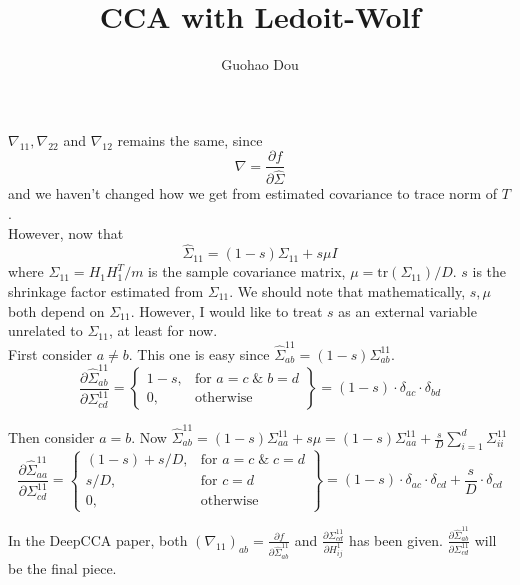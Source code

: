 \documentclass[12pt]{article}
\begin{document}
 
 
\title{CCA with Ledoit-Wolf}%
\author{Guohao Dou} %
 
\maketitle
$\nabla_{11}, \nabla_{22}$ and $\nabla_{12}$ remains the same, since 
\[\nabla = \frac{\partial f}{\partial \hat\Sigma}\]
and we haven't changed how we get from estimated covariance to trace norm of $T$.\\

However, now that 
\[\hat\Sigma_{11} = (1-s)\Sigma_{11} + s\mu I\]
where $\Sigma_{11} = H_1H_1^T / m$ is the sample covariance matrix, $\mu = \text{tr}(\Sigma_{11})/D$. $s$ is the shrinkage factor estimated from $\Sigma_{11}$. We should note that mathematically, $s, \mu$ both depend on $\Sigma_{11}$. However, I would like to treat $s$ as an external variable unrelated to $\Sigma_{11}$, at least for now. \\

First consider $a \neq b$. This one is easy since $\hat\Sigma_{ab}^{11} = (1-s)\Sigma^{11}_{ab}$. 
\[
\frac{\partial \hat\Sigma^{11}_{ab}}{\partial \Sigma^{11}_{cd}} = \left.
\begin{cases}
  1 - s, & \text{for } a = c \;\&\; b = d \\
  0, & \text{otherwise}
\end{cases}
\right\} = (1 - s)\cdot \delta_{ac}\cdot \delta_{bd}
\]

Then consider $a = b$. Now $\hat\Sigma_{ab}^{11} = (1-s)\Sigma^{11}_{aa} + s\mu = (1-s)\Sigma^{11}_{aa} + \frac{s}{D}\sum_{i=1}^d \Sigma_{ii}^{11}$
\[
\frac{\partial \hat\Sigma^{11}_{aa}}{\partial \Sigma^{11}_{cd}} = \left.
\begin{cases}
  (1 - s) + s/D, & \text{for } a = c \;\&\; c = d \\
  s/D, & \text{for } c = d \\
  0, & \text{otherwise}
\end{cases}
\right\} = (1 - s)\cdot \delta_{ac}\cdot\delta_{cd} + \frac{s}{D}\cdot \delta_{cd}
\]

In the DeepCCA paper, both $(\nabla_{11})_{ab} = \frac{\partial f}{\partial \hat\Sigma^{11}_{ab}}$ and $\frac{\partial \Sigma^{11}_{cd}}{\partial H^1_{ij}}$ has been given. $\frac{\partial \hat\Sigma^{11}_{ab}}{\partial\Sigma^{11}_{cd}}$ will be the final piece.
\end{document}
